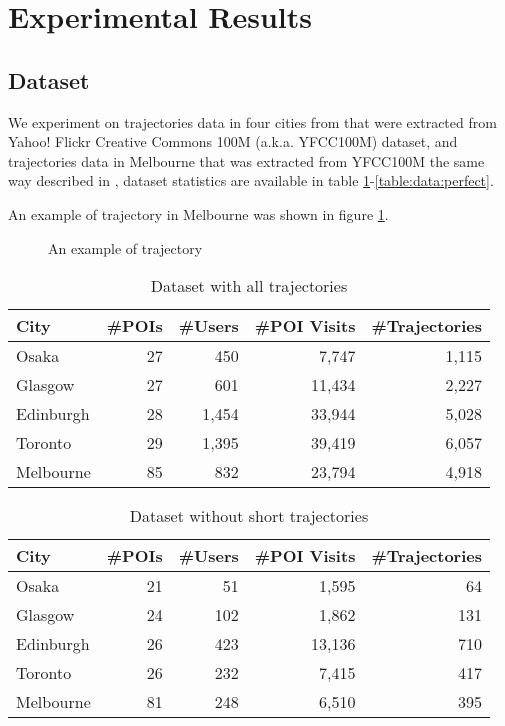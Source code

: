 \section{Experimental Results}
\label{experiment}

\subsection{Dataset}
\label{experiment:dataset}
We experiment on trajectories data in four cities from \cite{ijcai15} that were
extracted from Yahoo! Flickr Creative Commons 100M (a.k.a. YFCC100M) dataset\cite{yfcc100m},
and trajectories data in Melbourne that was extracted from YFCC100M the same way described in \cite{ht10, ijcai15},
dataset statistics are available in table \ref{table:data:all}-\ref{table:data:perfect}.

An example of trajectory in Melbourne was shown in figure \ref{fig:traj}.

\begin{figure}
\centering
{}
\caption{An example of trajectory}
\label{fig:traj}
\end{figure}


\begin{table}
\centering
\caption{Dataset with all trajectories}
\label{table:data:all}
\scriptsize
\begin{tabular}{lrrrr} \hline
\textbf{City} & \textbf{\#POIs} & \textbf{\#Users} & \textbf{\#POI Visits} & \textbf{\#Trajectories} \\ \hline
Osaka & 27 & 450 & 7,747 & 1,115 \\ 
Glasgow & 27 & 601 & 11,434 & 2,227 \\ 
Edinburgh & 28 & 1,454 & 33,944 & 5,028 \\ 
Toronto & 29 & 1,395 & 39,419 & 6,057 \\ 
Melbourne & 85 & 832 & 23,794 & 4,918 \\ 
\hline
\end{tabular}
\end{table}

\begin{table}
\centering
\caption{Dataset without short trajectories}
\label{table:data:noshort}
\scriptsize
\begin{tabular}{lrrrr} \hline
\textbf{City} & \textbf{\#POIs} & \textbf{\#Users} & \textbf{\#POI Visits} & \textbf{\#Trajectories} \\ \hline
Osaka & 21 & 51 & 1,595 & 64 \\ 
Glasgow & 24 & 102 & 1,862 & 131 \\ 
Edinburgh & 26 & 423 & 13,136 & 710 \\ 
Toronto & 26 & 232 & 7,415 & 417 \\ 
Melbourne & 81 & 248 & 6,510 & 395 \\ 
\hline
\end{tabular}
\end{table}

